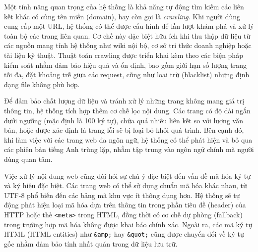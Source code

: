 Một tính năng quan trọng của hệ thống là khả năng tự động tìm kiếm các liên kết khác có cùng tên miền (domain), hay còn gọi là \emph{crawling}. Khi người dùng cung cấp một URL, hệ thống có thể được cấu hình để lần lượt khám phá và xử lý toàn bộ các trang liên quan. Cơ chế này đặc biệt hữu ích khi thu thập dữ liệu từ các nguồn mang tính hệ thống như wiki nội bộ, cơ sở tri thức doanh nghiệp hoặc tài liệu kỹ thuật. Thuật toán crawling được triển khai kèm theo các biện pháp kiểm soát nhằm đảm bảo hiệu quả và ổn định, bao gồm giới hạn số lượng trang tối đa, đặt khoảng trễ giữa các request, cũng như loại trừ (blacklist) những định dạng file không phù hợp.

Để đảm bảo chất lượng dữ liệu và tránh xử lý những trang không mang giá trị thông tin, hệ thống tích hợp thêm cơ chế lọc nội dung. Các trang có độ dài ngắn dưới ngưỡng (mặc định là 100 ký tự), chứa quá nhiều liên kết so với lượng văn bản, hoặc được xác định là trang lỗi sẽ bị loại bỏ khỏi quá trình. Bên cạnh đó, khi làm việc với các trang web đa ngôn ngữ, hệ thống có thể phát hiện và bỏ qua các phiên bản tiếng Anh trùng lặp, nhằm tập trung vào ngôn ngữ chính mà người dùng quan tâm.

Việc xử lý nội dung web cũng đòi hỏi sự chú ý đặc biệt đến vấn đề mã hóa ký tự và ký hiệu đặc biệt. Các trang web có thể sử dụng chuẩn mã hóa khác nhau, từ UTF-8 phổ biến đến các bảng mã khu vực ít thông dụng hơn. Hệ thống sẽ tự động phát hiện loại mã hóa dựa trên thông tin trong phần tiêu đề (header) của HTTP hoặc thẻ \texttt{<meta>} trong HTML, đồng thời có cơ chế dự phòng (fallback) trong trường hợp mã hóa không được khai báo chính xác. Ngoài ra, các mã ký tự HTML (HTML entities) như \texttt{\&amp;} hay \texttt{\&quot;} cũng được chuyển đổi về ký tự gốc nhằm đảm bảo tính nhất quán trong dữ liệu lưu trữ.
